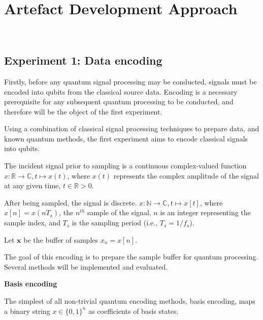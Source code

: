 \section{Artefact Development Approach}~\label{sec:approach}


\subsection{Experiment 1: Data encoding}
Firstly, before any quantum signal processing may be conducted, signals must be encoded into qubits from the classical source data.
Encoding is a necessary prerequisite for any subsequent quantum processing to be conducted, and therefore will be the object of the first experiment.

Using a combination of classical signal processing techniques to prepare data, and known quantum methods, the first experiment aims to encode classical signals into qubits.

The incident signal prior to sampling is a continuous complex-valued function
$x : \mathbb{R} \rightarrow \mathbb{C}, t \mapsto x(t)$,
where $x(t)$ represents the complex amplitude of the signal at any given time, $t \in \mathbb{R} > 0$.

After being sampled, the signal is discrete.
$x : \mathbb{N} \rightarrow \mathbb{C}, t \mapsto x[t]$,
where $x[n] = x(n T_s)$, the $n^{th}$ sample of the signal, $n$ is an integer representing the sample index, and $T_s$ is the sampling period (i.e., $T_s = 1/f_s$).

Let $\mathbf{x}$ be the buffer of samples $x_n=x[n]$.

The goal of this encoding is to prepare the sample buffer for quantum processing.
Several methods will be implemented and evaluated.

\textbf{Basis encoding}


The simplest of all non-trivial quantum encoding methods, basis encoding, maps a binary string $x \in {\{0,1\}}^n$ as coefficients of basis states.

